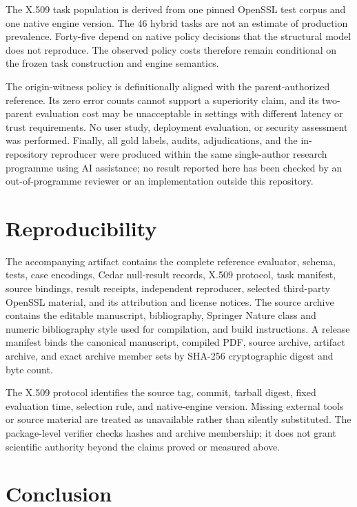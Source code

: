\documentclass[pdflatex,sn-mathphys-num]{sn-jnl}
\begin{document}
The X.509 task population is derived from one pinned OpenSSL test corpus and one native engine version. The 46 hybrid tasks are not an estimate of production prevalence. Forty-five depend on native policy decisions that the structural model does not reproduce. The observed policy costs therefore remain conditional on the frozen task construction and engine semantics.

The origin-witness policy is definitionally aligned with the parent-authorized reference. Its zero error counts cannot support a superiority claim, and its two-parent evaluation cost may be unacceptable in settings with different latency or trust requirements. No user study, deployment evaluation, or security assessment was performed. Finally, all gold labels, audits, adjudications, and the in-repository reproducer were produced within the same single-author research programme using AI assistance; no result reported here has been checked by an out-of-programme reviewer or an implementation outside this repository.

\section{Reproducibility}\label{reproducibility}

The accompanying artifact contains the complete reference evaluator, schema, tests, case encodings, Cedar null-result records, X.509 protocol, task manifest, source bindings, result receipts, independent reproducer, selected third-party OpenSSL material, and its attribution and license notices. The source archive contains the editable manuscript, bibliography, Springer Nature class and numeric bibliography style used for compilation, and build instructions. A release manifest binds the canonical manuscript, compiled PDF, source archive, artifact archive, and exact archive member sets by SHA-256 cryptographic digest and byte count.

The X.509 protocol identifies the source tag, commit, tarball digest, fixed evaluation time, selection rule, and native-engine version. Missing external tools or source material are treated as unavailable rather than silently substituted. The package-level verifier checks hashes and archive membership; it does not grant scientific authority beyond the claims proved or measured above.

\section{Conclusion}\label{conclusion}
\end{document}
